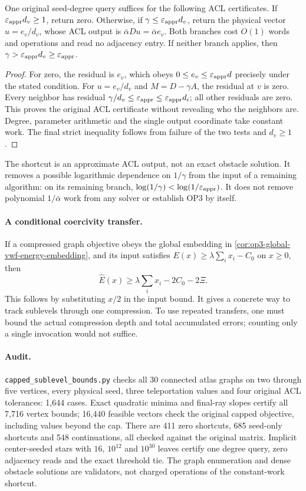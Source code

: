 \begin{proposition}
\label{prop:op3-seed-only-shortcut}
One original seed-degree query suffices for the following ACL certificates.
If $\varepsilon_{\mathrm{appr}} d_v\geq1$, return zero. Otherwise, if
$\gamma\leq\varepsilon_{\mathrm{appr}} d_v$, return the physical vector $u=e_v/d_v$,
whose ACL output is $\bar\alpha Du=\bar\alpha e_v$.
Both branches cost $O(1)$ words and operations and read no adjacency entry.
If neither branch applies, then $\gamma>\varepsilon_{\mathrm{appr}} d_v\geq\varepsilon_{\mathrm{appr}}$.
\end{proposition}
\begin{proof}
For zero, the residual is $e_v$, which obeys
$0\leq e_v\leq\varepsilon_{\mathrm{appr}} d$ precisely under the stated condition.
For $u=e_v/d_v$ and $M=D-\gamma A$, the residual at $v$ is zero.
Every neighbor has residual $\gamma/d_v\leq\varepsilon_{\mathrm{appr}}\leq\varepsilon_{\mathrm{appr}} d_i$;
all other residuals are zero. This proves the original ACL certificate
without revealing who the neighbors are. Degree, parameter arithmetic
and the single output coordinate take constant work. The final strict
inequality follows from failure of the two tests and $d_v\geq1$.
\end{proof}

The shortcut is an approximate ACL output, not an exact obstacle solution.
It removes a possible logarithmic dependence on $1/\gamma$ from the input
of a remaining algorithm: on its remaining branch,
$\log(1/\gamma)<\log(1/\varepsilon_{\mathrm{appr}})$. It does not remove polynomial
$1/\bar\alpha$ work from any solver or establish OP3 by itself.

\paragraph{A conditional coercivity transfer.}
If a compressed graph objective obeys the global embedding in
\cref{cor:op3-global-vwf-energy-embedding}, and its input satisfies
$E(x)\geq\lambda\sum_i x_i-C_0$ on $x\geq0$, then
\[
 \widehat E(x)\geq\lambda\sum_i x_i-2C_0-2\Xi.
\]
This follows by substituting $x/2$ in the input bound. It gives a concrete
way to track sublevels through one compression. To use repeated transfers,
one must bound the actual compression depth and total accumulated errors;
counting only a single invocation would not suffice.

\paragraph{Audit.}
\texttt{capped\_sublevel\_bounds.py} checks all 30 connected atlas graphs
on two through five vertices, every physical seed, three teleportation
values and four original ACL tolerances: 1,644 cases. Exact quadratic
minima and final-ray slopes certify all 7,716 vertex bounds; 16,440
feasible vectors check the original capped objective, including values
beyond the cap. There are 411 zero shortcuts, 685 seed-only shortcuts and
548 continuations, all checked against the original matrix. Implicit
center-seeded stars with $16$, $10^{12}$ and $10^{30}$ leaves certify one
degree query, zero adjacency reads and the exact threshold tie. The graph
enumeration and dense obstacle solutions are validators, not charged
operations of the constant-work shortcut.
